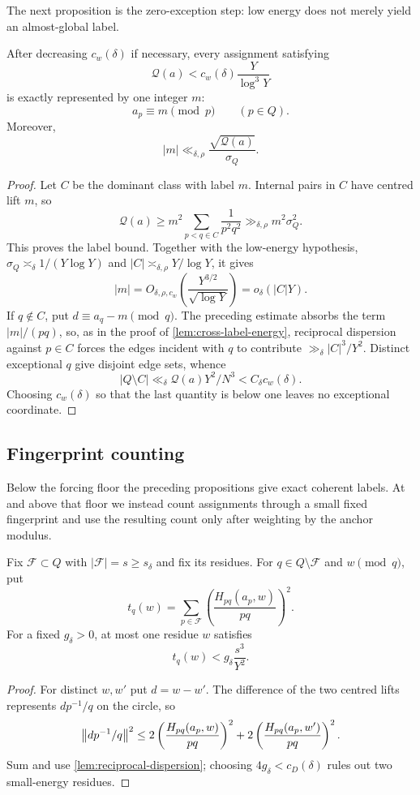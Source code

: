 The next proposition is the zero-exception step: low energy does not merely yield an almost-global label.

\begin{proposition}
\label{prop:exact-anchor-rigidity}
After decreasing $c_w(\delta)$ if necessary, every assignment satisfying
\[
 \mathcal Q(a)<c_w(\delta)\frac{Y}{\log^3Y}
\]
is exactly represented by one integer $m$:
\[
 a_p\equiv m\pmod p\qquad(p\in Q).
\]
Moreover,
\[
 |m|\ll_{\delta,\rho}\frac{\sqrt{\mathcal Q(a)}}{\sigma_Q}.
\]
\end{proposition}
\begin{proof}
Let $C$ be the dominant class with label $m$. Internal pairs in $C$ have centred lift $m$, so
\[
 \mathcal Q(a)\geq m^2\sum_{p<q\in C}\frac1{p^2q^2}\gg_{\delta,\rho}m^2\sigma_Q^2.
\]
This proves the label bound. Together with the low-energy hypothesis, $\sigma_Q\asymp_\delta1/(Y\log Y)$ and $|C|\asymp_{\delta,\rho}Y/\log Y$, it gives
\[
 |m|=O_{\delta,\rho,c_w}\!\left(\frac{Y^{3/2}}{\sqrt{\log Y}}\right)=o_\delta(|C|Y).
\]
If $q\notin C$, put $d\equiv a_q-m\pmod q$. The preceding estimate absorbs the term $|m|/(pq)$, so, as in the proof of \cref{lem:cross-label-energy}, reciprocal dispersion against $p\in C$ forces the edges incident with $q$ to contribute $\gg_\delta |C|^3/Y^2$. Distinct exceptional $q$ give disjoint edge sets, whence
\[
 |Q\setminus C|\ll_\delta \mathcal Q(a)Y^2/N^3<C_\delta c_w(\delta).
\]
Choosing $c_w(\delta)$ so that the last quantity is below one leaves no exceptional coordinate.
\end{proof}

\subsection{Fingerprint counting}

Below the forcing floor the preceding propositions give exact coherent labels. At and above that floor we instead count assignments through a small fixed fingerprint and use the resulting count only after weighting by the anchor modulus.

\begin{lemma}
\label{lem:fingerprint-rigidity}
Fix $\mathcal F\subset Q$ with $|\mathcal F|=s\geq s_\delta$ and fix its residues. For $q\in Q\setminus\mathcal F$ and $w\pmod q$, put
\[
 t_q(w)=\sum_{p\in\mathcal F}\left(\frac{H_{pq}(a_p,w)}{pq}\right)^2.
\]
For a fixed $g_\delta>0$, at most one residue $w$ satisfies
\[
 t_q(w)<g_\delta\frac{s^3}{Y^2}.
\]
\end{lemma}
\begin{proof}
For distinct $w,w'$ put $d=w-w'$. The difference of the two centred lifts represents $dp^{-1}/q$ on the circle, so
\[
 \left\lVert dp^{-1}/q\right\rVert^2\leq2\left(\frac{H_{pq}(a_p,w)}{pq}\right)^2+2\left(\frac{H_{pq}(a_p,w')}{pq}\right)^2.
\]
Sum and use \cref{lem:reciprocal-dispersion}; choosing $4g_\delta<c_D(\delta)$ rules out two small-energy residues.
\end{proof}

